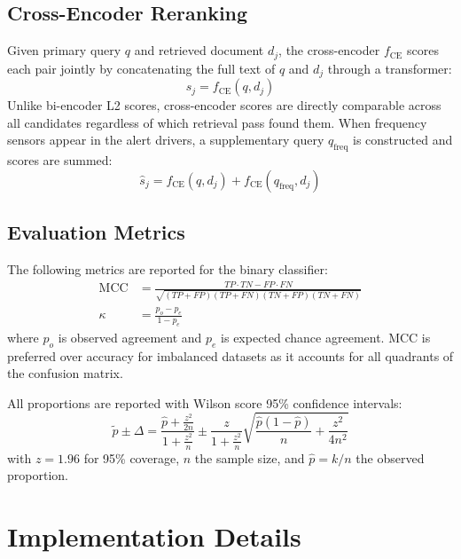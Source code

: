 \documentclass[twocolumn, 10pt, letterpaper]{article}
\begin{document}
\subsection*{Cross-Encoder Reranking}

Given primary query $q$ and retrieved document $d_j$, the cross-encoder
$f_{\text{CE}}$ scores each pair jointly by concatenating the full text of
$q$ and $d_j$ through a transformer:
\begin{equation}
    s_j = f_{\text{CE}}(q, d_j)
\end{equation}
Unlike bi-encoder L2 scores, cross-encoder scores are directly comparable across all
candidates regardless of which retrieval pass found them.
When frequency sensors appear in the alert drivers, a supplementary query
$q_{\text{freq}}$ is constructed and scores are summed:
\begin{equation}
    \hat{s}_j = f_{\text{CE}}(q, d_j) + f_{\text{CE}}(q_{\text{freq}}, d_j)
\end{equation}

\subsection*{Evaluation Metrics}

The following metrics are reported for the binary classifier:
\begin{align}
    \text{MCC} &= \frac{TP \cdot TN - FP \cdot FN}{\sqrt{(TP{+}FP)(TP{+}FN)(TN{+}FP)(TN{+}FN)}} \\[4pt]
    \kappa &= \frac{p_o - p_e}{1 - p_e}
\end{align}
where $p_o$ is observed agreement and $p_e$ is expected chance agreement.
MCC is preferred over accuracy for imbalanced datasets as it accounts for all
quadrants of the confusion matrix.

All proportions are reported with Wilson score 95\% confidence intervals:
\begin{equation}
    \tilde{p} \pm \Delta = \frac{\hat{p} + \frac{z^2}{2n}}{1 + \frac{z^2}{n}}
    \pm \frac{z}{1 + \frac{z^2}{n}}
    \sqrt{\frac{\hat{p}(1-\hat{p})}{n} + \frac{z^2}{4n^2}}
\end{equation}
with $z = 1.96$ for 95\% coverage, $n$ the sample size, and $\hat{p} = k/n$
the observed proportion.

\section{Implementation Details}
\label{app:impl}
\end{document}
